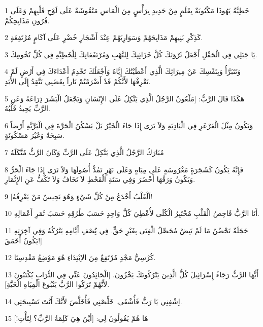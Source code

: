 \par 1 خَطِيَّةُ يَهُوذَا مَكْتُوبَةٌ بِقَلَمٍ مِنْ حَدِيدٍ بِرَأْسٍ مِنَ الْمَاسِ مَنْقُوشَةٌ عَلَى لَوْحِ قَلْبِهِمْ وَعَلَى قُرُونِ مَذَابِحِكُمْ.
\par 2 كَذِكْرِ بَنِيهِمْ مَذَابِحَهُمْ وَسَوَارِيَهُمْ عِنْدَ أَشْجَارٍ خُضْرٍ عَلَى آكَامٍ مُرْتَفِعَةٍ.
\par 3 يَا جَبَلِي فِي الْحَقْلِ أَجْعَلُ ثَرْوَتَكَ كُلَّ خَزَائِنِكَ لِلنَّهْبِ وَمُرْتَفَعَاتِكَ لِلْخَطِيَّةِ فِي كُلِّ تُخُومِكَ.
\par 4 وَتَتَبَرَّأُ وَبِنَفْسِكَ عَنْ مِيرَاثِكَ الَّذِي أَعْطَيْتُكَ إِيَّاهُ وَأَجْعَلُكَ تَخْدِمُ أَعْدَاءَكَ فِي أَرْضٍ لَمْ تَعْرِفْهَا لأَنَّكُمْ قَدْ أَضْرَمْتُمْ نَاراً بِغَضَبِي تَتَّقِدُ إِلَى الأَبَدِ.
\par 5 هَكَذَا قَالَ الرَّبُّ: [مَلْعُونٌ الرَّجُلُ الَّذِي يَتَّكِلُ عَلَى الإِنْسَانِ وَيَجْعَلُ الْبَشَرَ ذِرَاعَهُ وَعَنِ الرَّبِّ يَحِيدُ قَلْبُهُ.
\par 6 وَيَكُونُ مِثْلَ الْعَرْعَرِ فِي الْبَادِيَةِ وَلاَ يَرَى إِذَا جَاءَ الْخَيْرُ بَلْ يَسْكُنُ الْحَرَّةَ فِي الْبَرِّيَّةِ أَرْضاً سَبِخَةً وَغَيْرَ مَسْكُونَةٍ.
\par 7 مُبَارَكٌ الرَّجُلُ الَّذِي يَتَّكِلُ عَلَى الرَّبِّ وَكَانَ الرَّبُّ مُتَّكَلَهُ
\par 8 فَإِنَّهُ يَكُونُ كَشَجَرَةٍ مَغْرُوسَةٍ عَلَى مِيَاهٍ وَعَلَى نَهْرٍ تَمُدُّ أُصُولَهَا وَلاَ تَرَى إِذَا جَاءَ الْحَرُّ وَيَكُونُ وَرَقُهَا أَخْضَرَ وَفِي سَنَةِ الْقَحْطِ لاَ تَخَافُ وَلاَ تَكُفُّ عَنِ الإِثْمَارِ.
\par 9 [اَلْقَلْبُ أَخْدَعُ مِنْ كُلِّ شَيْءٍ وَهُوَ نَجِيسٌ مَنْ يَعْرِفُهُ!
\par 10 أَنَا الرَّبُّ فَاحِصُ الْقَلْبِ مُخْتَبِرُ الْكُلَى لأُعْطِيَ كُلَّ وَاحِدٍ حَسَبَ طُرُقِهِ حَسَبَ ثَمَرِ أَعْمَالِهِ.
\par 11 حَجَلَةٌ تَحْضُنُ مَا لَمْ تَبِضْ مُحَصِّلُ الْغِنَى بِغَيْرِ حَقٍّ. فِي نَُِصْفِ أَيَّامِهِ يَتْرُكُهُ وَفِي آخِرَتِهِ يَكُونُ أَحْمَقَ!]
\par 12 كُرْسِيُّ مَجْدٍ مُرْتَفِعٌ مِنَ الاِبْتِدَاءِ هُوَ مَوْضِعُ مَقْدِسِنَا.
\par 13 أَيُّهَا الرَّبُّ رَجَاءُ إِسْرَائِيلَ كُلُّ الَّذِينَ يَتْرُكُونَكَ يَخْزُونَ. [الْحَائِدُونَ عَنِّي فِي التُّرَابِ يُكْتَبُونَ لأَنَّهُمْ تَرَكُوا الرَّبَّ يَنْبُوعَ الْمِيَاهِ الْحَيَّةِ].
\par 14 اِشْفِنِي يَا رَبُّ فَأُشْفَى. خَلِّصْنِي فَأُخَلَّصَ لأَنَّكَ أَنْتَ تَسْبِيحَتِي.
\par 15 هَا هُمْ يَقُولُونَ لِي: [أَيْنَ هِيَ كَلِمَةُ الرَّبِّ؟ لِتَأْتِ!]
